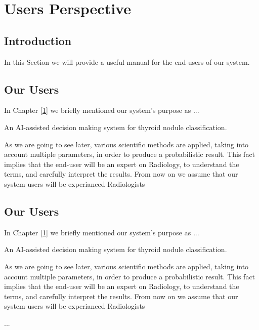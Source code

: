 \chapter{Users Perspective}
\label{ch:lit_rev}
	\section{Introduction}
		In this Section we will provide a useful manual for the end-users of our system. 
	\section{Our Users}
		In Chapter \ref{1} we briefly mentioned our system's purpose as ...
		\begin{mydef}
			An AI-assisted decision making system for thyroid nodule classification.
		\end{mydef}
		As we are going to see later, various scientific methods are applied, taking into account 
		multiple parameters, in order to produce a probabilistic result. This fact implies that the
		end-user will be an expert on Radiology, to understand the terms, and carefully interpret the 
		results. From now on we assume that our system users will be experianced Radiologists
	\section{Our Users}
		In Chapter \ref{1} we briefly mentioned our system's purpose as ...
		\begin{mydef}
			An AI-assisted decision making system for thyroid nodule classification.
		\end{mydef}
		As we are going to see later, various scientific methods are applied, taking into account 
		multiple parameters, in order to produce a probabilistic result. This fact implies that the
		end-user will be an expert on Radiology, to understand the terms, and carefully interpret the 
		results. From now on we assume that our system users will be experianced Radiologists
		
	
...


